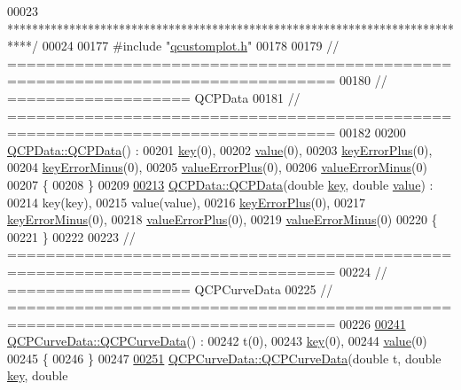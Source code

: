 \begin{DoxyCode}
00023 \textcolor{comment}{****************************************************************************/}
00024 
00177 \textcolor{preprocessor}{#include "\hyperlink{a00116}{qcustomplot.h}"}
00178 
00179 \textcolor{comment}{// ================================================================================}
00180 \textcolor{comment}{// =================== QCPData}
00181 \textcolor{comment}{// ================================================================================}
00182 
00200 \hyperlink{a00116_aa274181ae8de2a0907ba5464d3c2c103}{QCPData::QCPData}() :
00201   \hyperlink{a00116_a94bb892c30911cd62cba0707a5395be4}{key}(0),
00202   \hyperlink{a00116_aee90379adb0307effb138f4871edbc5c}{value}(0),
00203   \hyperlink{a00116_a1d47938cd7209297ef861cf01816d89f}{keyErrorPlus}(0),
00204   \hyperlink{a00116_a7d90a6258f6d24ad254245076e5beac7}{keyErrorMinus}(0),
00205   \hyperlink{a00116_a6d93a38079a2b52118982e82673e87a3}{valueErrorPlus}(0),
00206   \hyperlink{a00116_aea31bce613e569fc5e1888465c677909}{valueErrorMinus}(0)
00207 \{
00208 \}
00209 
\hypertarget{a00115_source_l00213}{}\hyperlink{a00116_aa274181ae8de2a0907ba5464d3c2c103}{00213} \hyperlink{a00116_aa274181ae8de2a0907ba5464d3c2c103}{QCPData::QCPData}(\textcolor{keywordtype}{double} \hyperlink{a00116_a94bb892c30911cd62cba0707a5395be4}{key}, \textcolor{keywordtype}{double} \hyperlink{a00116_aee90379adb0307effb138f4871edbc5c}{value}) :
00214   key(key),
00215   value(value),
00216   \hyperlink{a00116_a1d47938cd7209297ef861cf01816d89f}{keyErrorPlus}(0),
00217   \hyperlink{a00116_a7d90a6258f6d24ad254245076e5beac7}{keyErrorMinus}(0),
00218   \hyperlink{a00116_a6d93a38079a2b52118982e82673e87a3}{valueErrorPlus}(0),
00219   \hyperlink{a00116_aea31bce613e569fc5e1888465c677909}{valueErrorMinus}(0)
00220 \{
00221 \}
00222 
00223 \textcolor{comment}{// ================================================================================}
00224 \textcolor{comment}{// =================== QCPCurveData}
00225 \textcolor{comment}{// ================================================================================}
00226 
\hypertarget{a00115_source_l00241}{}\hyperlink{a00029_a48252779b5198a509d99c69ae223fbf8}{00241} \hyperlink{a00029_a48252779b5198a509d99c69ae223fbf8}{QCPCurveData::QCPCurveData}() :
00242   t(0),
00243   \hyperlink{a00116_a94bb892c30911cd62cba0707a5395be4}{key}(0),
00244   \hyperlink{a00116_aee90379adb0307effb138f4871edbc5c}{value}(0)
00245 \{
00246 \}
00247 
\hypertarget{a00115_source_l00251}{}\hyperlink{a00029_a3586be0cc6f8db15bcdd0c0d03b0c173}{00251} \hyperlink{a00029_a48252779b5198a509d99c69ae223fbf8}{QCPCurveData::QCPCurveData}(\textcolor{keywordtype}{double} t, \textcolor{keywordtype}{double} \hyperlink{a00116_a94bb892c30911cd62cba0707a5395be4}{key}, \textcolor{keywordtype}{double} 

\end{DoxyCode}
